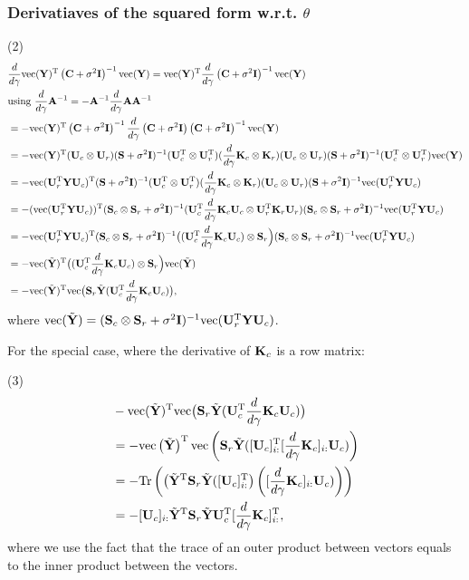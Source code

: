 \documentclass{article}
\newcommand{\B}[1]{{\bf{#1}}}
\begin{document}
\subsubsection{Derivatiaves of the squared form w.r.t. $\theta$}
(2)\\
\begin{align*}&
\dg \col(\B{Y})^{\T} \BS^{-1}\col(\B{Y})  = \col(\B{Y})^{\T} \dg
\BS^{-1} \col(\B{Y})  \\&
 \text{using $\dg \bfA^{-1} = -\bfA^{-1} \dg \bfA \bfA^{-1}$}\\&
  =-\col(\B{Y})^{\T} \BS^{-1} \dg \BS \BS^{-1} \col(\B{Y}) \\&
  = -\col({\bfY})^{\T} (\B{U}_c \otimes \B{U}_r) (\B{S} + \sigma^{2}
\B{I})^{-1} (\B{U}_c^{\T} \otimes \B{U}_r^{\T}) (\dg \B{K}_c \otimes \B{K}_r)
(\B{U}_c \otimes \B{U}_r) (\B{S} + \sigma^{2} \B{I})^{-1} (\B{U}_c^{\T}
\otimes \B{U}_r^{\T}) {\col(\B{Y})} \\&
  = -\col (\B{U}_r^{\T} \bfY \B{U}_c)^{\T} (\B{S} + \sigma^{2}\B{I})^{-1} (\B{U}_c^{\T}
\otimes \B{U}_r^{\T}) (\dg \B{K}_c \otimes \B{K}_r) (\B{U}_c \otimes
\B{U}_r)(\B{S} + \sigma^{2}\B{I})^{-1} \col (\B{U}_r^{\T} \bfY \B{U}_c) \\&
  = -(\col (\B{U}_r^{\T} \bfY \B{U}_c))^{\T} (\B{S}_c \otimes \B{S}_r + \sigma^{2}\B{I})^{-1} (\B{U}_c^{\T}
\dg \B{K}_c \B{U}_c \otimes \B{U}_r^{\T} \B{K}_r \B{U}_r)(\B{S}_c \otimes \B{S}_r +
\sigma^{2}\B{I})^{-1} \col (\B{U}_r^{\T} \bfY \B{U}_c) \\& 
  = -\col (\B{U}_r^{\T} \bfY \B{U}_c)^{\T} (\B{S}_c \otimes \B{S}_r + \sigma^{2}\B{I})^{-1} \big((\B{U}_c^{\T}
\dg \B{K}_c \B{U}_c) \otimes \B{S}_r\Big)(\B{S}_c \otimes \B{S}_r +
\sigma^{2}\B{I})^{-1} \col (\B{U}_r^{\T} \bfY \B{U}_c) \\&
  = -\col (\tilde\bfY)^{\T} \big((\B{U}_c^{\T}
\dg \B{K}_c \B{U}_c) \otimes \B{S}_r\Big) \col (\tilde {\bfY}) \\&
   = -\col (\tilde\bfY) ^{\T}\col \big(\B{S}_r\tilde\bfY (\B{U}_c^{\T}
 \dg \B{K}_c \B{U}_c)\big),
 \end{align*}
 where $\col (\tilde\bfY) = (\B{S}_c \otimes \B{S}_r +
 \sigma^{2}\B{I})^{-1} \col (\B{U}_r^{\T} \bfY \B{U}_c)$.

For the special case, where the derivative of $\B{K}_c$ is a row matrix:

(3)\
\begin{align*}&
-\col (\tilde\bfY) ^{\T}\col \big(\B{S}_r\tilde\bfY (\B{U}_c^{\T}
\dg \B{K}_c \B{U}_c)\big)\\&
=- \col\left({\tilde\bfY}\right)^{\T}
\col\left({\B{S}_r\tilde\bfY ([\B{U}_c]_{i:}^{\T}
[\dg \B{K}_c]_{i:} \B{U}_c)}\right)
\\&
=- \Tr\left(\left({\tilde\bfY}^{\T}
\B{S}_r\tilde\bfY ([\B{U}_c]_{i:}^{\T}\right)\left(
[\dg \B{K}_c]_{i:} \B{U}_c)\right)\right)
\\&
=-
{[\B{U}_c]_{i:}\tilde\bfY^{\T} \B{S}_r \tilde\bfY}
\B{U}_c^{\T} [\dg \B{K}_c]_{i:}^{\T},
\end{align*}
where we use the fact that the trace of an outer product between
vectors equals to the inner product between the vectors.
\end{document}
